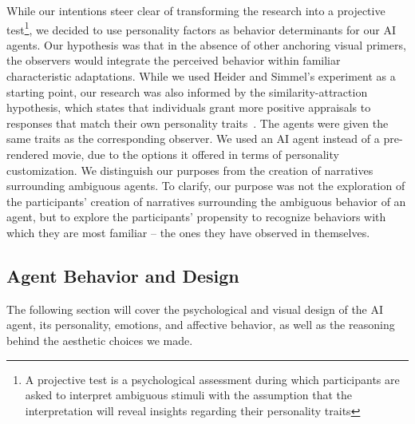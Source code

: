 While our intentions steer clear of transforming the research into a projective test\footnote{A projective test is a psychological assessment during which participants are asked to interpret ambiguous stimuli with the assumption that the interpretation will reveal insights regarding their personality traits}, we decided to use personality factors as behavior determinants for our AI agents. Our hypothesis was that in the absence of other anchoring visual primers, the observers would integrate the perceived behavior within familiar characteristic adaptations. While we used Heider and Simmel’s experiment as a starting point, our research was also informed by the similarity-attraction hypothesis, which states that individuals grant more positive appraisals to responses that match their own personality traits~. The agents were given the same traits as the corresponding observer. We used an AI agent instead of a pre-rendered movie, due to the options it offered in terms of personality customization. We distinguish our purposes from the creation of narratives surrounding ambiguous agents. To clarify, our purpose was not the exploration of the participants’ creation of narratives surrounding the ambiguous behavior of an agent, but to explore the participants’ propensity to recognize behaviors with which they are most familiar – the ones they have observed in themselves.

\subsection{Agent Behavior and Design}

The following section will cover the psychological and visual design of the AI agent, its personality, emotions, and affective behavior, as well as the reasoning behind the aesthetic choices we made.

